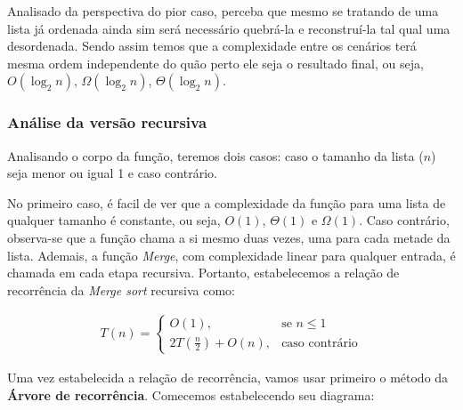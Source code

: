 Analisado da perspectiva do pior caso, perceba que mesmo se tratando de uma lista já ordenada ainda sim será necessário quebrá-la e reconstruí-la tal qual uma desordenada. Sendo assim temos que a complexidade entre os cenários terá mesma ordem independente do quão perto ele seja o resultado final, ou seja, $O(\log_2{n})$, $\Omega(\log_2{n})$, $\Theta(\log_2{n})$.

\subsubsection{Análise da versão recursiva}

Analisando o corpo da função, teremos dois casos: caso o tamanho da lista ($n$) seja menor ou igual 1 e caso contrário.

\begin{algorithm}
	\begin{algorithmic}[0]
		 \Return
		\EndIf
		\State {}
	\end{algorithmic}
\end{algorithm}
\FloatBarrier

No primeiro caso, é facil de ver que a complexidade da função para uma lista de qualquer tamanho é constante, ou seja, $O(1)$, $\Theta(1)$ e $\Omega(1)$. Caso contrário, observa-se que a função chama a si mesmo duas vezes, uma para cada metade da lista. Ademais, a função \textit{Merge}, com complexidade linear para qualquer entrada, é chamada em cada etapa recursiva. Portanto, estabelecemos a relação de recorrência da \textit{Merge sort} recursiva como:

\begin{align*}
	T(n) =
	\begin{cases}
		O(1),                   & \text{se $n \leq 1$}  \\
		2T(\frac{n}{2}) + O(n), & \text{caso contrário}
	\end{cases}
\end{align*}

Uma vez estabelecida a relação de recorrência, vamos usar primeiro o método da \textbf{Árvore de recorrência}. Comecemos estabelecendo seu diagrama:

